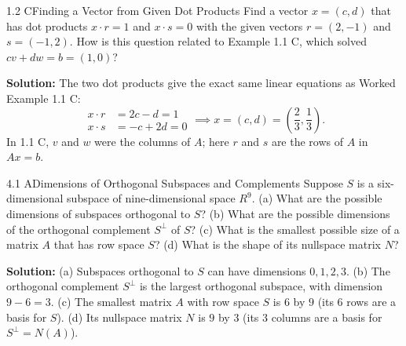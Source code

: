 \documentclass[11pt,a4paper,openany,oneside]{book}
\def\vect#1{#1}%
\def\mathbf#1{#1}%
\newcommand{\vect}[1]{\mathbf{#1}}
\numberwithin{equation}{chapter}
\begin{document}
\begin{example}{1.2 C}{Finding a Vector from Given Dot Products}
Find a vector $\vect{x} = (c, d)$ that has dot products $\vect{x}\cdot\vect{r} = 1$ and $\vect{x}\cdot\vect{s} = 0$ with the given vectors $\vect{r} = (2, -1)$ and $\vect{s} = (-1, 2)$. How is this question related to Example 1.1 C, which solved $c\vect{v} + d\vect{w} = \vect{b} = (1, 0)$?
\end{example}
\textbf{Solution:} The two dot products give the exact same linear equations as Worked Example 1.1 C:
\[
\begin{aligned}
\vect{x}\cdot\vect{r} &= 2c - d = 1 \\
\vect{x}\cdot\vect{s} &= -c + 2d = 0
\end{aligned}
\implies \vect{x} = (c,d) = \left(\frac{2}{3}, \frac{1}{3}\right).
\]
In 1.1 C, $\vect{v}$ and $\vect{w}$ were the columns of $A$; here $\vect{r}$ and $\vect{s}$ are the rows of $A$ in $A\vect{x} = \vect{b}$.

\begin{example}{4.1 A}{Dimensions of Orthogonal Subspaces and Complements}
Suppose $\mathbf{S}$ is a six-dimensional subspace of nine-dimensional space $\mathbf{R}^9$.
(a) What are the possible dimensions of subspaces orthogonal to $\mathbf{S}$?
(b) What are the possible dimensions of the orthogonal complement $\mathbf{S}^\perp$ of $\mathbf{S}$?
(c) What is the smallest possible size of a matrix $A$ that has row space $\mathbf{S}$?
(d) What is the shape of its nullspace matrix $N$?
\end{example}
\textbf{Solution:}
(a) Subspaces orthogonal to $\mathbf{S}$ can have dimensions $0, 1, 2, 3$.
(b) The orthogonal complement $\mathbf{S}^\perp$ is the largest orthogonal subspace, with dimension $9 - 6 = 3$.
(c) The smallest matrix $A$ with row space $\mathbf{S}$ is $6$ by $9$ (its $6$ rows are a basis for $\mathbf{S}$).
(d) Its nullspace matrix $N$ is $9$ by $3$ (its $3$ columns are a basis for $\mathbf{S}^\perp = N(A)$).
\end{document}
